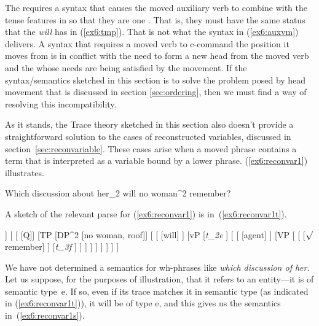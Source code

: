 The requires a syntax that causes the moved auxiliary verb to combine with the tense features in  so that they are one . That is, they must have the same status that the  \emph{will} has in (\ref{ex6:tmp}). That is not what the syntax in (\ref{ex6:auxvm}) delivers. A syntax that requires a moved verb to c-command the position it moves from is in conflict with the need to form a new head from the moved verb and the  whose needs are being satisfied by the movement. If the syntax/semantics sketched in this section is to solve the problem posed by head movement that is discussed in section \ref{sec:ordering}, then we must find a way of resolving this incompatibility.%
%
%
%

As it stands, the Trace theory sketched in this section also doesn't provide a straightforward solution to the cases of reconstructed variables, discussed in section~\ref{sec:reconvariable}. These cases arise when a moved phrase contains a term that is interpreted as a variable bound by a lower phrase. (\ref{ex6:reconvar1}) illustrates.
\begin{exe}
\raggedright
	\ex \label{ex6:reconvar1}
	Which discussion about her_2 will no woman^2 remember?
\end{exe}
A sketch of the relevant parse for (\ref{ex6:reconvar1}) is in~(\ref{ex6:reconvar1t}).
\begin{exe}
\raggedright
	\ex \label{ex6:reconvar1t}
	\small
	\begin{forest}
	[CP
		[DP^3 [which discussion of her_2, roof]]
		[ 
			[ [Q]]
			[TP
				[DP^2 [no woman, roof]]
				[ 
					[ [will] ]
					[vP
						[\emph{t_{2e}} ]
						[
							[ [agent] ]
							[VP [
								[ [$\surd$remember] ]
									[\emph{t_{3f}} ]
								] 
							] ]
						 ]
					 ]
				]
			 ]
		]
	\end{forest}
\end{exe}
We have not determined a semantics for wh-phrases like \emph{which discussion of her}. Let us suppose, for the purposes of illustration, that it refers to an entity---it is of semantic type~e. If so, even if its trace matches it in semantic type (as indicated in (\ref{ex6:reconvar1t})), it will be of type e, and this gives us the semantics in~(\ref{ex6:reconvar1s}).
\medskip
